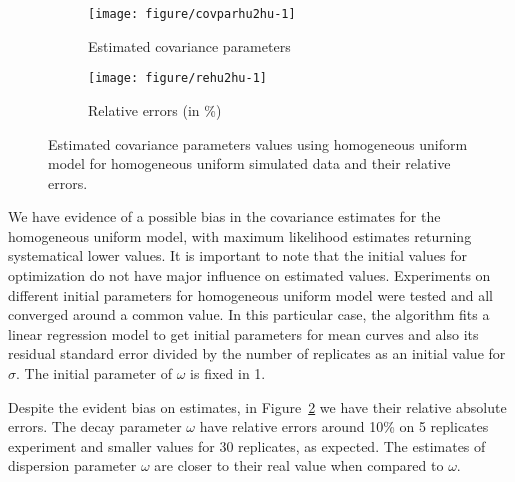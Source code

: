 \begin{figure}[t]
  \begin{subfigure}{\textwidth}
  \centering
\begin{knitrout}
\color{fgcolor}
\texttt{[image: figure/covparhu2hu-1]} 

\end{knitrout}
    \caption{Estimated covariance parameters} \label{fig:cpest-hu2hu}
  \end{subfigure}
  \begin{subfigure}{\textwidth}
  \centering
\begin{knitrout}
\color{fgcolor}
\texttt{[image: figure/rehu2hu-1]} 

\end{knitrout}
    \caption{Relative errors (in \%) }\label{fig:re-hu2hu}
  \end{subfigure}
  \caption{Estimated covariance parameters values using homogeneous uniform model for homogeneous uniform simulated data and their relative errors.}
  \label{fig:cp-hu2hu}
\end{figure}

We have evidence of a possible bias in the covariance estimates for the homogeneous uniform model, with maximum likelihood estimates returning systematical lower values. It is important to note that the initial values for optimization do not have major influence on estimated values. Experiments on different initial parameters for homogeneous uniform model were tested and all converged around a common value. In this particular case, the algorithm fits a linear regression model to get initial parameters for mean curves and also its residual standard error divided by the number of replicates as an initial value for $\sigma$. The initial parameter of $\omega$ is fixed in 1.


Despite the evident bias on estimates, in Figure~\ref{fig:re-hu2hu} we have their relative absolute errors. The decay parameter $\omega$ have relative errors around 10\% on 5 replicates experiment and smaller values for 30 replicates, as expected. The estimates of dispersion parameter $\omega$ are closer to their real value when compared to $\omega$.

 

